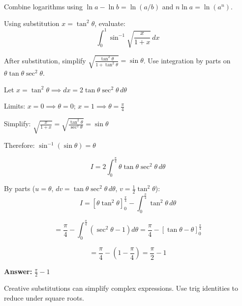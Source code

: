 \begin{takeaways}
Combine logarithms using $\ln a - \ln b = \ln(a/b)$ and $n\ln a = \ln(a^n)$.
\end{takeaways}

\vspace{1cm}

\begin{problem}
Using substitution $x = \tan^2 \theta$, evaluate:
\[
\int_0^1 \sin^{-1} \sqrt{\frac{x}{1+x}} \, dx
\]
\end{problem}

\begin{hint}
After substitution, simplify $\sqrt{\frac{\tan^2\theta}{1+\tan^2\theta}} = \sin\theta$. Use integration by parts on $\theta \tan\theta \sec^2\theta$.
\end{hint}

\begin{solution}
Let $x = \tan^2\theta \implies dx = 2\tan\theta\sec^2\theta \, d\theta$

Limits: $x=0 \implies \theta=0$; $x=1 \implies \theta=\frac{\pi}{4}$

Simplify: $\sqrt{\frac{x}{1+x}} = \sqrt{\frac{\tan^2\theta}{\sec^2\theta}} = \sin\theta$

Therefore: $\sin^{-1}(\sin\theta) = \theta$

\[
I = 2\int_0^{\frac{\pi}{4}} \theta \tan\theta \sec^2\theta \, d\theta
\]

By parts ($u=\theta$, $dv=\tan\theta\sec^2\theta \, d\theta$, $v=\frac{1}{2}\tan^2\theta$):
\[
I = [\theta\tan^2\theta]_0^{\frac{\pi}{4}} - \int_0^{\frac{\pi}{4}} \tan^2\theta \, d\theta
\]

\[
= \frac{\pi}{4} - \int_0^{\frac{\pi}{4}} (\sec^2\theta - 1) d\theta = \frac{\pi}{4} - [\tan\theta - \theta]_0^{\frac{\pi}{4}}
\]

\[
= \frac{\pi}{4} - (1 - \frac{\pi}{4}) = \frac{\pi}{2} - 1
\]

\textbf{Answer:} $\boxed{\frac{\pi}{2} - 1}$
\end{solution}

\begin{takeaways}
Creative substitutions can simplify complex expressions. Use trig identities to reduce under square roots.
\end{takeaways}

\vspace{1cm}

